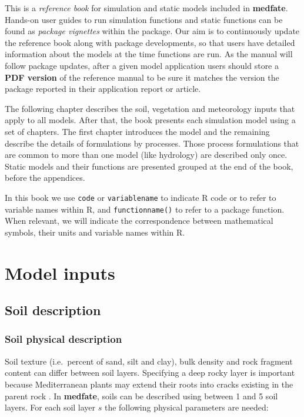 \documentclass[]{book}
\begin{document}
This is a \emph{reference book} for simulation and static models included in \textbf{medfate}. Hands-on user guides to run simulation functions and static functions can be found as \emph{package vignettes} within the package. Our aim is to continuously update the reference book along with package developments, so that users have detailed information about the models at the time functions are run. As the manual will follow package updates, after a given model application users should store a \textbf{PDF version} of the reference manual to be sure it matches the version the package reported in their application report or article.

The following chapter describes the soil, vegetation and meteorology inputs that apply to all models. After that, the book presents each simulation model using a set of chapters. The first chapter introduces the model and the remaining describe the details of formulations by processes. Those process formulations that are common to more than one model (like hydrology) are described only once. Static models and their functions are presented grouped at the end of the book, before the appendices.

In this book we use \texttt{code} or \texttt{variablename} to indicate R code or to refer to variable names within R, and \texttt{functionname()} to refer to a package function. When relevant, we will indicate the correspondence between mathematical symbols, their units and variable names within R.

\hypertarget{model-inputs}{%
\chapter{Model inputs}\label{model-inputs}}

\hypertarget{soil-description}{%
\section{Soil description}\label{soil-description}}

\hypertarget{soil-physical-description}{%
\subsection{Soil physical description}\label{soil-physical-description}}

Soil texture (i.e.~percent of sand, silt and clay), bulk density and rock fragment content can differ between soil layers. Specifying a deep rocky layer is important because Mediterranean plants may extend their roots into cracks existing in the parent rock \citep{Ruffault2013}. In \textbf{medfate}, soils can be described using between 1 and 5 soil layers. For each soil layer \(s\) the following physical parameters are needed:
\end{document}
